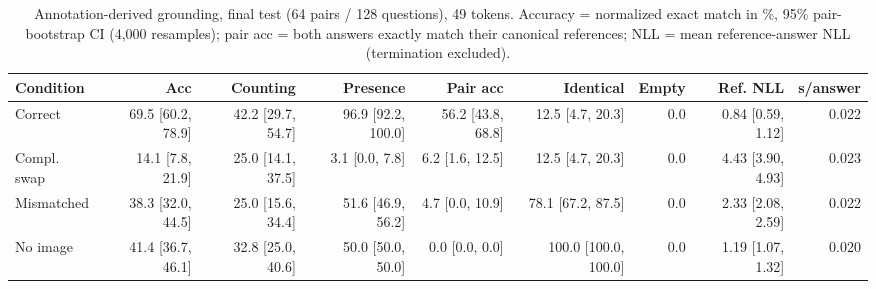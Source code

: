 \begin{table}[t]
\centering
\small
\caption{Annotation-derived grounding, final test (64 pairs / 128 questions), 49 tokens. Accuracy = normalized exact match in \%, 95\% pair-bootstrap CI (4,000 resamples); pair acc = both answers exactly match their canonical references; NLL = mean reference-answer NLL (termination excluded).}
\label{tab:t2_t2_final_grounding_compress49}
\begin{tabular}{lrrrrrrrr}
\toprule
Condition & Acc & Counting & Presence & Pair acc & Identical & Empty & Ref. NLL & s/answer \\
\midrule
Correct & 69.5 [60.2, 78.9] & 42.2 [29.7, 54.7] & 96.9 [92.2, 100.0] & 56.2 [43.8, 68.8] & 12.5 [4.7, 20.3] & 0.0 & 0.84 [0.59, 1.12] & 0.022 \\
Compl. swap & 14.1 [7.8, 21.9] & 25.0 [14.1, 37.5] & 3.1 [0.0, 7.8] & 6.2 [1.6, 12.5] & 12.5 [4.7, 20.3] & 0.0 & 4.43 [3.90, 4.93] & 0.023 \\
Mismatched & 38.3 [32.0, 44.5] & 25.0 [15.6, 34.4] & 51.6 [46.9, 56.2] & 4.7 [0.0, 10.9] & 78.1 [67.2, 87.5] & 0.0 & 2.33 [2.08, 2.59] & 0.022 \\
No image & 41.4 [36.7, 46.1] & 32.8 [25.0, 40.6] & 50.0 [50.0, 50.0] & 0.0 [0.0, 0.0] & 100.0 [100.0, 100.0] & 0.0 & 1.19 [1.07, 1.32] & 0.020 \\
\bottomrule
\end{tabular}
\end{table}
